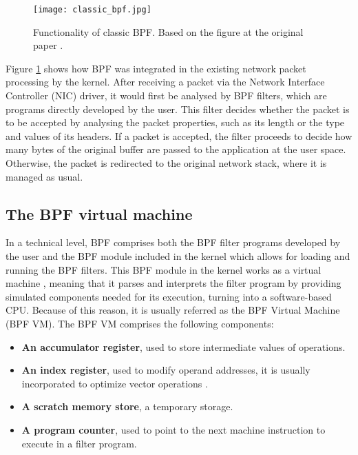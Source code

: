 \begin{figure}[htbp]
	\centering
	\texttt{[image: classic\_bpf.jpg]}
	\caption{Functionality of classic BPF. Based on the figure at the original paper \cite{bpf_bsd_origin_bpf_page2}.}
	\label{fig:classif_bpf}
\end{figure}

Figure \ref{fig:classif_bpf} shows how BPF was integrated in the existing network packet processing by the kernel. After receiving a packet via the Network Interface Controller (NIC) driver, it would first be analysed by BPF filters, which are programs directly developed by the user. This filter decides whether the packet is to be accepted by analysing the packet properties, such as its length or the type and values of its headers. If a packet is accepted, the filter proceeds to decide how many bytes of the original buffer are passed to the application at the user space. Otherwise, the packet is redirected to the original network stack, where it is managed as usual.


\subsection{The BPF virtual machine} \label{subsection:bpf_vm}
In a technical level, BPF comprises both the BPF filter programs developed by the user and the BPF module included in the kernel which allows for loading and running the BPF filters. This BPF module in the kernel works as a virtual machine \cite{bpf_bsd_origin_bpf_page1}, meaning that it parses and interprets the filter program by providing simulated components needed for its execution, turning into a software-based CPU. Because of this reason, it is usually referred as the BPF Virtual Machine (BPF VM). The BPF VM comprises the following components:
\begin{itemize}
\item \textbf{An accumulator register}, used to store intermediate values of operations.
\item \textbf{An index register}, used to modify operand addresses, it is usually incorporated to optimize vector operations \cite{index_register}.
\item \textbf{A scratch memory store}, a temporary storage.
\item \textbf{A program counter}, used to point to the next machine instruction to execute in a filter program.
\end{itemize}


